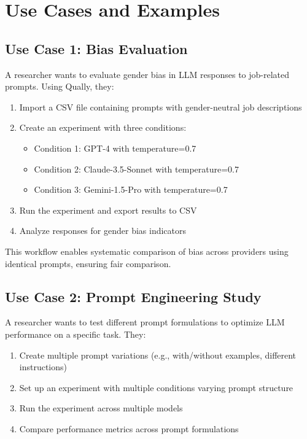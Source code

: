 \documentclass[11pt,a4paper]{article}
\begin{document}
\section{Use Cases and Examples}
\label{sec:use_cases}

\subsection{Use Case 1: Bias Evaluation}

A researcher wants to evaluate gender bias in LLM responses to job-related prompts. Using Qually, they:

\begin{enumerate}
    \item Import a CSV file containing prompts with gender-neutral job descriptions
    \item Create an experiment with three conditions:
    \begin{itemize}
        \item Condition 1: GPT-4 with temperature=0.7
        \item Condition 2: Claude-3.5-Sonnet with temperature=0.7
        \item Condition 3: Gemini-1.5-Pro with temperature=0.7
    \end{itemize}
    \item Run the experiment and export results to CSV
    \item Analyze responses for gender bias indicators
\end{enumerate}

This workflow enables systematic comparison of bias across providers using identical prompts, ensuring fair comparison.

\subsection{Use Case 2: Prompt Engineering Study}

A researcher wants to test different prompt formulations to optimize LLM performance on a specific task. They:

\begin{enumerate}
    \item Create multiple prompt variations (e.g., with/without examples, different instructions)
    \item Set up an experiment with multiple conditions varying prompt structure
    \item Run the experiment across multiple models
    \item Compare performance metrics across prompt formulations
\end{enumerate}
\end{document}
